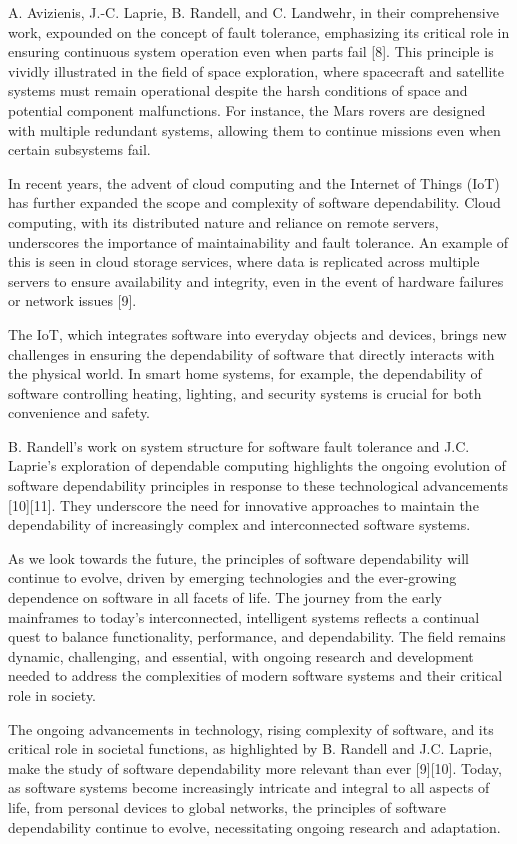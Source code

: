 \documentclass[sigconf]{acmart}
\begin{document}
A. Avizienis, J.-C. Laprie, B. Randell, and C. Landwehr, in their comprehensive work, expounded on the concept of fault tolerance, emphasizing its critical role in ensuring continuous system operation even when parts fail [8]. This principle is vividly illustrated in the field of space exploration, where spacecraft and satellite systems must remain operational despite the harsh conditions of space and potential component malfunctions. For instance, the Mars rovers are designed with multiple redundant systems, allowing them to continue missions even when certain subsystems fail.

In recent years, the advent of cloud computing and the Internet of Things (IoT) has further expanded the scope and complexity of software dependability. Cloud computing, with its distributed nature and reliance on remote servers, underscores the importance of maintainability and fault tolerance. An example of this is seen in cloud storage services, where data is replicated across multiple servers to ensure availability and integrity, even in the event of hardware failures or network issues [9].

The IoT, which integrates software into everyday objects and devices, brings new challenges in ensuring the dependability of software that directly interacts with the physical world. In smart home systems, for example, the dependability of software controlling heating, lighting, and security systems is crucial for both convenience and safety.

B. Randell's work on system structure for software fault tolerance and J.C. Laprie's exploration of dependable computing highlights the ongoing evolution of software dependability principles in response to these technological advancements [10][11]. They underscore the need for innovative approaches to maintain the dependability of increasingly complex and interconnected software systems.

As we look towards the future, the principles of software dependability will continue to evolve, driven by emerging technologies and the ever-growing dependence on software in all facets of life. The journey from the early mainframes to today's interconnected, intelligent systems reflects a continual quest to balance functionality, performance, and dependability. The field remains dynamic, challenging, and essential, with ongoing research and development needed to address the complexities of modern software systems and their critical role in society.


The ongoing advancements in technology, rising complexity of software, and its critical role in societal functions, as highlighted by B. Randell and J.C. Laprie, make the study of software dependability more relevant than ever [9][10]. Today, as software systems become increasingly intricate and integral to all aspects of life, from personal devices to global networks, the principles of software dependability continue to evolve, necessitating ongoing research and adaptation.
\end{document}
